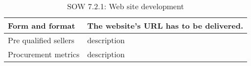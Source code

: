 \begin{table}[H]
\begin{tabular}{>{\raggedright\arraybackslash}p{3cm} >{\arraybackslash}p{11cm}}
		\midrule
		
		Form and format & The website's URL has to be delivered.\vspace{0.2cm} \\
		
		\midrule
		
		Pre qualified sellers & description\vspace{0.2cm} \\
		
		\midrule
		
		Procurement metrics & description\vspace{0.2cm} \\
		
		\bottomrule[2pt]		
		
	\end{tabular}
	\caption{SOW 7.2.1: Web site development}
\end{table}

